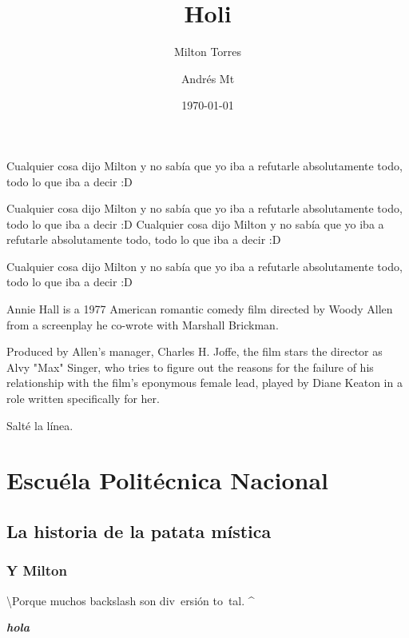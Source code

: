 \documentclass[a5paper, 12pt]{article}
\author{Milton Torres \and Andrés Mt}
\title{Holi}
\date{\today}
\begin{document}
	\maketitle

	Cualquier cosa dijo                                                                                                                                                                Milton y no sabía que yo iba a refutarle absolutamente todo, todo lo que iba a decir :D
	
{	\color{yellow}Cualquier cosa dijo Milton y no sabía que yo iba a refutarle absolutamente todo, todo lo que iba a decir :D}
Cualquier cosa dijo Milton y no sabía que yo iba a refutarle absolutamente todo, todo lo que iba a decir :D

Cualquier cosa dijo Milton y no sabía que yo iba a refutarle absolutamente todo, todo lo que iba a decir :D


\setlength{\columnsep}{30pt}
\begin{multicols}{2}
		Annie Hall is a 1977 American romantic comedy film directed by Woody Allen from a screenplay he co-wrote with Marshall Brickman.
		
		 Produced by Allen’s manager, Charles H. Joffe, the film stars the director as Alvy "Max" Singer, who tries to figure out the reasons for the failure of his relationship with the film’s eponymous female lead, played by Diane Keaton in a role written specifically for her.
\end{multicols}
	
	Salté la línea.
	
	\section[EPN]{Escuéla Politécnica Nacional}
	
	\subsection{La historia de la patata mística}
	\subsubsection{Y Milton}
	
	\textbackslash Po\hspace{2\baselineskip}rque m\qquad uchos back\quad slash son div\, ersión to\ tal. \^{}
	
	
	\textbf{\emph{hola}}	
\end{document}
